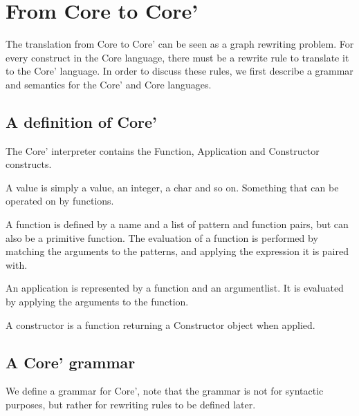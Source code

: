 



\chapter{From Core to Core'}

The translation from Core to Core' can be seen as a graph rewriting problem. For
every construct in the Core language, there must be a rewrite rule to translate it
to the Core' language. In order to discuss these rules, we first describe a grammar
and semantics for the Core' and Core languages.

\section{A definition of Core'}

The Core' interpreter contains the Function, Application and Constructor constructs.

A value is simply a value, an integer, a char and so on. Something that can be
operated on by functions.

A function is defined by a name and a list of pattern and function pairs,
but can also be a primitive function.
The evaluation of a function is performed by matching the arguments to
the patterns, and applying the expression it is paired with.

An application is represented by a function and an argumentlist. It is
evaluated by applying the arguments to the function.

A constructor is a function returning a Constructor object when applied. 

\section{A Core' grammar}

We define a grammar for Core', note that the grammar is not for syntactic
purposes, but rather for rewriting rules to be defined later.

